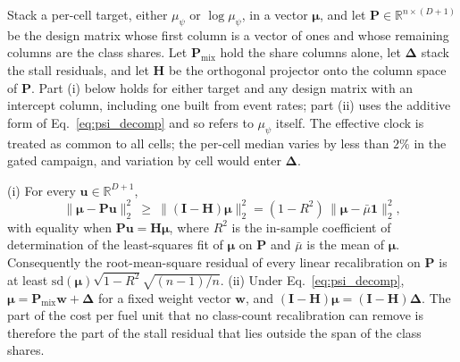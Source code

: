 \documentclass{ws-jcsc}
\begin{document}
Stack a per-cell target, either $\mu_\psi$ or $\log\mu_\psi$, in a vector $\boldsymbol{\mu}$, and let $\mathbf{P}\in\mathbb{R}^{n\times(D+1)}$ be the design matrix whose first column is a vector of ones and whose remaining columns are the class shares. Let $\mathbf{P}_{\mathrm{mix}}$ hold the share columns alone, let $\boldsymbol{\Delta}$ stack the stall residuals, and let $\mathbf{H}$ be the orthogonal projector onto the column space of $\mathbf{P}$. Part (i) below holds for either target and any design matrix with an intercept column, including one built from event rates; part (ii) uses the additive form of Eq.~\eqref{eq:psi_decomp} and so refers to $\mu_\psi$ itself. The effective clock is treated as common to all cells; the per-cell median varies by less than $2\%$ in the gated campaign, and variation by cell would enter $\boldsymbol{\Delta}$.

\begin{proposition}\label{prop:linear_bound}
(i) For every $\mathbf{u}\in\mathbb{R}^{D+1}$,
\begin{equation*}
\|\boldsymbol{\mu}-\mathbf{P}\mathbf{u}\|_2^2\ \ge\ \|(\mathbf{I}-\mathbf{H})\boldsymbol{\mu}\|_2^2=(1-R^2)\,\|\boldsymbol{\mu}-\bar{\mu}\mathbf{1}\|_2^2,
\end{equation*}
with equality when $\mathbf{P}\mathbf{u}=\mathbf{H}\boldsymbol{\mu}$, where $R^2$ is the in-sample coefficient of determination of the least-squares fit of $\boldsymbol{\mu}$ on $\mathbf{P}$ and $\bar{\mu}$ is the mean of $\boldsymbol{\mu}$. Consequently the root-mean-square residual of every linear recalibration on $\mathbf{P}$ is at least $\mathrm{sd}(\boldsymbol{\mu})\sqrt{1-R^2}\sqrt{(n-1)/n}$.
(ii) Under Eq.~\eqref{eq:psi_decomp}, $\boldsymbol{\mu}=\mathbf{P}_{\mathrm{mix}}\mathbf{w}+\boldsymbol{\Delta}$ for a fixed weight vector $\mathbf{w}$, and $(\mathbf{I}-\mathbf{H})\boldsymbol{\mu}=(\mathbf{I}-\mathbf{H})\boldsymbol{\Delta}$. The part of the cost per fuel unit that no class-count recalibration can remove is therefore the part of the stall residual that lies outside the span of the class shares.
\end{proposition}
\end{document}
